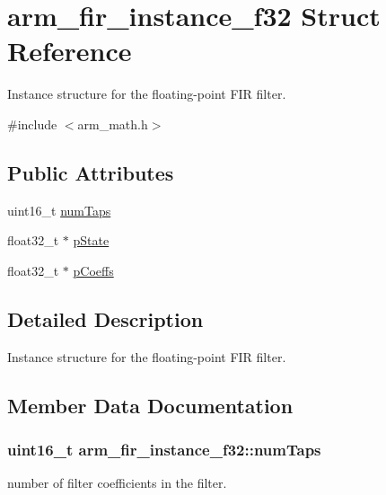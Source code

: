 \hypertarget{structarm__fir__instance__f32}{}\section{arm\+\_\+fir\+\_\+instance\+\_\+f32 Struct Reference}
\label{structarm__fir__instance__f32}


Instance structure for the floating-\/point F\+IR filter.  




{\ttfamily \#include $<$arm\+\_\+math.\+h$>$}

\subsection*{Public Attributes}
\begin{DoxyCompactItemize}
\item 
uint16\+\_\+t \hyperlink{structarm__fir__instance__f32_a20cf98c92b5323799b7881c9ff4d2f7c}{num\+Taps}
\item 
float32\+\_\+t $\ast$ \hyperlink{structarm__fir__instance__f32_a7afcf4022e8560db9b8fd28b0d090a15}{p\+State}
\item 
float32\+\_\+t $\ast$ \hyperlink{structarm__fir__instance__f32_a1c9cfca901d5902afeb640f2831488f4}{p\+Coeffs}
\end{DoxyCompactItemize}


\subsection{Detailed Description}
Instance structure for the floating-\/point F\+IR filter. 

\subsection{Member Data Documentation}
\subsubsection[{\texorpdfstring{num\+Taps}{numTaps}}]{\setlength{\rightskip}{0pt plus 5cm}uint16\+\_\+t arm\+\_\+fir\+\_\+instance\+\_\+f32\+::num\+Taps}\hypertarget{structarm__fir__instance__f32_a20cf98c92b5323799b7881c9ff4d2f7c}{}\label{structarm__fir__instance__f32_a20cf98c92b5323799b7881c9ff4d2f7c}
number of filter coefficients in the filter. 

